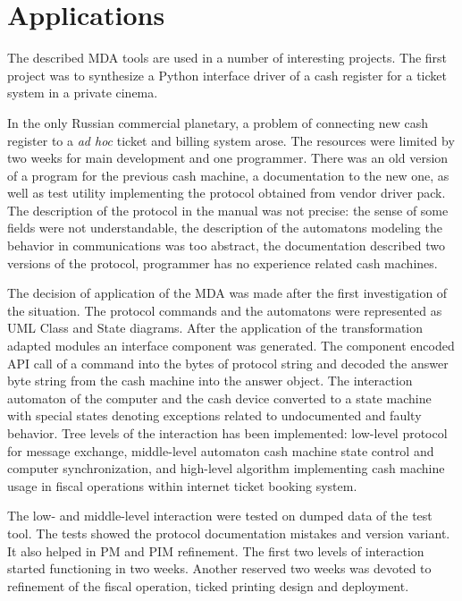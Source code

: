 \documentclass[runningheads]{llncs}
\begin{document}
\section{Applications}
\label{sec:app}

The described MDA tools are used in a number of interesting projects.  The first project was to synthesize a Python interface driver of a cash register for a ticket system in a private cinema.

In the only Russian commercial planetary, a problem of connecting new cash register to a \emph{ad hoc} ticket and billing system arose.  The resources were limited by two weeks for main development and one programmer.  There was an old version of a program for the previous cash machine, a documentation to the new one, as well as test utility implementing the protocol obtained from vendor driver pack.  The description of the protocol in the manual was not precise: the sense of some fields were not understandable, the description of the automatons modeling the behavior in communications was too abstract, the documentation described two versions of the protocol, programmer has no experience related cash machines.

The decision of application of the MDA was made after the first investigation of the situation.  The protocol commands and the automatons were represented as UML Class and State diagrams.  After the application of the transformation adapted modules an interface component was generated.  The component encoded API call of a command into the bytes of protocol string and decoded the answer byte string from the cash machine into the answer object.  The interaction automaton of the computer and the cash device converted to a state machine with special states denoting exceptions related to undocumented and faulty behavior.  Tree levels of the interaction has been implemented: low-level protocol for message exchange, middle-level automaton cash machine state control and computer synchronization, and high-level algorithm implementing cash machine usage in fiscal operations within internet ticket booking system.

The low- and middle-level interaction were tested on dumped data of the test tool.  The tests showed the protocol documentation mistakes and version variant.  It also helped in PM and PIM refinement.  The first two levels of interaction started functioning in two weeks.  Another reserved two weeks was devoted to refinement of the fiscal operation, ticked printing design and deployment.
\end{document}
